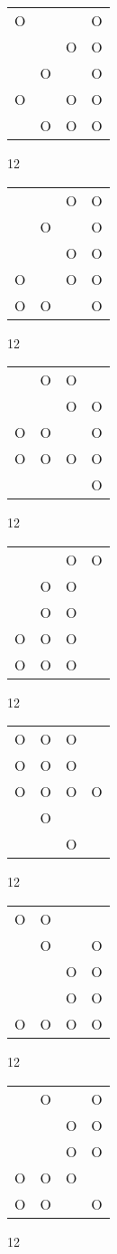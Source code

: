 \begin{tabular}{|m{0.2cm}m{0.2cm}m{0.2cm}m{0.2cm}|}\hline
O& & &O\\
 & &O&O\\
 &O& &O\\
O& &O&O\\
 &O&O&O\\
\hline\end{tabular}12
\begin{tabular}{|m{0.2cm}m{0.2cm}m{0.2cm}m{0.2cm}|}\hline
 & &O&O\\
 &O& &O\\
 & &O&O\\
O& &O&O\\
O&O& &O\\
\hline\end{tabular}12
\begin{tabular}{|m{0.2cm}m{0.2cm}m{0.2cm}m{0.2cm}|}\hline
 &O&O& \\
 & &O&O\\
O&O& &O\\
O&O&O&O\\
 & & &O\\
\hline\end{tabular}12
\begin{tabular}{|m{0.2cm}m{0.2cm}m{0.2cm}m{0.2cm}|}\hline
 & &O&O\\
 &O&O& \\
 &O&O& \\
O&O&O& \\
O&O&O& \\
\hline\end{tabular}12
\begin{tabular}{|m{0.2cm}m{0.2cm}m{0.2cm}m{0.2cm}|}\hline
O&O&O& \\
O&O&O& \\
O&O&O&O\\
 &O& & \\
 & &O& \\
\hline\end{tabular}12
\begin{tabular}{|m{0.2cm}m{0.2cm}m{0.2cm}m{0.2cm}|}\hline
O&O& & \\
 &O& &O\\
 & &O&O\\
 & &O&O\\
O&O&O&O\\
\hline\end{tabular}12
\begin{tabular}{|m{0.2cm}m{0.2cm}m{0.2cm}m{0.2cm}|}\hline
 &O& &O\\
 & &O&O\\
 & &O&O\\
O&O&O& \\
O&O& &O\\
\hline\end{tabular}12
